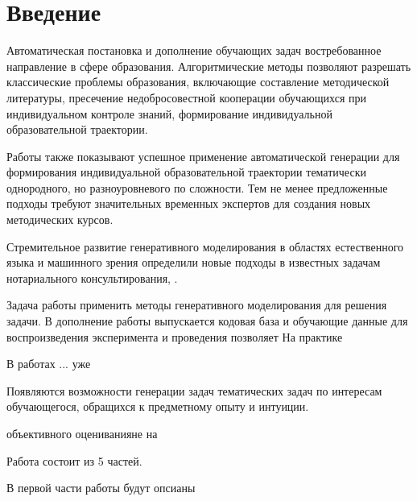 \chapter{Введение}

Автоматическая постановка и дополнение обучающих задач востребованное направление в сфере образования. 
Алгоритмические методы позволяют разрешать классические проблемы образования,
включающие составление методической литературы,
пресечение недобросовестной кооперации обучающихся при  индивидуальном контроле знаний,
формирование индивидуальной образовательной траектории.


Работы также показывают успешное применение автоматической генерации для формирования индивидуальной образовательной траектории
тематически однородного, но разноуровневого по сложности. Тем не менее предложенные подходы
требуют значительных временных экспертов для создания новых методических курсов. 

Стремительное развитие генеративного моделирования в областях естественного языка \cite{radford2019language} 
и машинного зрения \cite{rombach2022highresolution}\cite{song2020generative} определили
новые подходы в известных задачам нотариального консультирования, . 


Задача работы применить методы генеративного моделирования для решения задачи. В дополнение работы 
выпускается кодовая база и обучающие данные для воспроизведения эксперимента и проведения позволяет На практике 


В работах ... уже

Появляются возможности генерации задач тематических задач по интересам обучающегося, обращихся к предметному опыту и интуиции.

объективного оцениванияне на  




Работа состоит из 5 частей. 

В первой части работы будут опсианы 